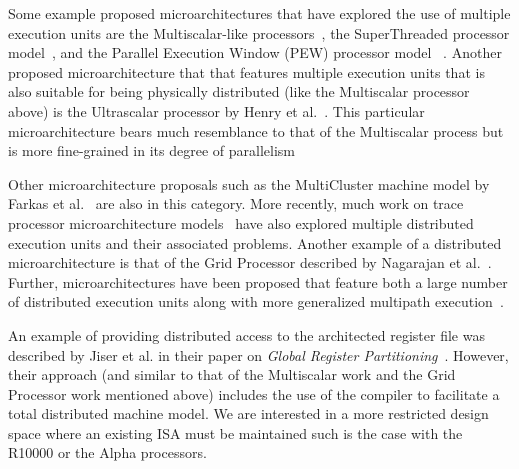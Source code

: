 \documentclass[10pt,dvips]{article}
\begin{document}
Some example proposed microarchitectures that have explored the
use of multiple execution units are the Multiscalar-like
processors~\cite{Sohi95,sundararaman97multiscalar},
the SuperThreaded processor model~\cite{tsai96superthread},
and
the Parallel Execution Window (PEW) processor model ~\cite{kemp96pew}.
Another proposed microarchitecture that that features
multiple execution units that is also suitable for being
physically distributed (like the Multiscalar processor above)
is the Ultrascalar processor by
Henry et al.~\cite{henry99}.
This particular microarchitecture bears much resemblance to that
of the Multiscalar process but is more fine-grained in its
degree of parallelism

Other microarchitecture proposals such as the MultiCluster machine
model by 
Farkas et al.~\cite{farkas97multicluster} are also in this category.
More recently, much work on trace processor microarchitecture 
models~\cite{rotenberg97trace,rotenberg99control,vajapeyam97sequences}
have also explored multiple distributed execution units and their associated
problems.
Another example of a distributed microarchitecture is that
of the Grid Processor described by Nagarajan et al.~\cite{nagarajan01grid}.
Further, microarchitectures have been proposed that feature both
a large number of distributed execution units along with more
generalized multipath execution~\cite{morano02high,uht02realizing}.

An example of providing distributed access to the architected
register file was described by Jiser et al. in their paper on
\textit{Global Register Partitioning}~\cite{Jiser00}.
However, their approach (and similar to that of the Multiscalar
work and the Grid Processor work mentioned above) includes
the use of the compiler to facilitate a total distributed 
machine model.
We are interested in a more restricted design space where an existing
ISA must be maintained such is the case with the R10000 or the Alpha
processors.
\end{document}
